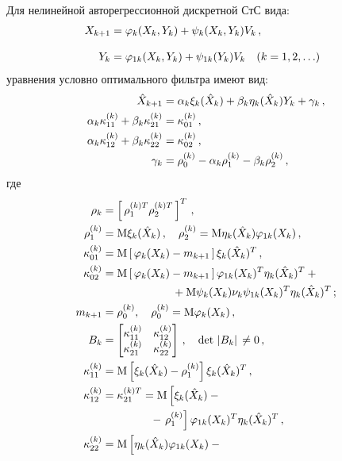 \begin{multicols}{2}
Для нелинейной авторегрессионной дискретной СтС вида:
    \begin{align}
\!\!\!\!X_{k+1} &= \varphi_k (X_k,Y_k ) +\psi_k (X_k,Y_k ) V_k\,,\notag\\[-6pt]
     &\\ %
\!\!\!\!Y_k &=\varphi_{1k}(X_k,Y_k ) +\psi_{1k} (Y_k) V_k \quad
    (k=1,2,\ldots)\notag
        \end{align}
уравнения условно оптимального фильтра имеют вид:
\begin{align*}
\hat X_{k+1} &= \alpha_k \xi_k (\hat X_k) + \beta_k\eta_k(\hat X_k) Y_k +\gamma_k 
\,,\\
\alpha_k \kappa_{11}^{(k)}+\beta_k \kappa_{21}^{(k)}&=\kappa_{01}^{(k)}\,,\\
\alpha_k \kappa_{12}^{(k)}+\beta_k \kappa_{22}^{(k)}&=\kappa_{02}^{(k)}\,,\\
\gamma_k &=\rho_{0}^{(k)}-\alpha_k \rho_{1}^{(k)}-\beta_k\rho_{2}^{(k)}\,,
\end{align*}
где
\begin{align*}
\rho_k &=\lk \rho_1^{(k)T}\rho_2^{(k)T}\rk^T\,,\\
\rho_1^{(k)} & = \mathrm{M} \xi_k (\hat X_k)\,,\quad
\rho_2^{(k)}=\mathrm{M} \eta_k (\hat X_k) \varphi_{1k} (X_k)\,,\\
\kappa_{01}^{(k)} &={\rm M} \lk \varphi_k (X_k) - m_{k+1}\rk \xi_k (\hat X_k)^T\,,\\
\kappa_{02}^{(k)} &= {\rm M} \lk \varphi_{k} (X_k) - m_{k+1}\rk \varphi_{1k} (X_k)^T \eta_k (\hat X_k)^T+{}\\
&\ \ \ \ \ \ \ \ \ \ \ \ \ \ \ \ \ \ \ {}+ {\rm M} \psi_k (X_k) \nu_k \psi_{1k} (X_k)^T \eta_k (\hat X_k)^T\,;\\
m_{k+1}&=\rho_0^{(k)},\quad \rho_0^{(k)}= {\rm M} \varphi_k (X_k)\,,\\
B_k &=\begin{bmatrix}
\kappa_{11}^{(k)}&\kappa_{12}^{(k)}\\
\kappa_{21}^{(k)}&\kappa_{22}^{(k)}
\end{bmatrix}\,,
\quad \det \lv B_k\rv \ne 0\,,\\
\kappa_{11}^{(k)} &={\rm M} \left [ \xi_k (\hat X_k) -\rho_1^{(k)}\right ] \xi_k (\hat X_k)^T\,,\\
\kappa_{12}^{(k)} &=\kappa_{21}^{(k)T}={\rm M} \left [ \xi_k (\hat X_k) -{}\right.\\
&\ \ \ \ \ \ \ \ \ \ \ \ \ {} - \left. \rho_1^{(k)}\right ] \varphi_{1k} 
(X_k)^T \eta_k
(\hat X_k)^T\,,\\
\kappa_{22}^{(k)} &= {\rm M} \left [ \eta_k (\hat X_k) \varphi_{1k} (X_k)-{}\right.\\

\end{align*}
\end{multicols}
